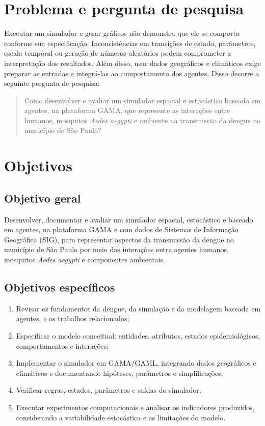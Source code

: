 \section{Problema e pergunta de pesquisa}

Executar um simulador e gerar gráficos não demonstra que ele se comporta conforme sua especificação. Inconsistências em transições de estado, parâmetros, escala temporal ou geração de números aleatórios podem comprometer a interpretação dos resultados. Além disso, usar dados geográficos e climáticos exige preparar as entradas e integrá-las ao comportamento dos agentes. Disso decorre a seguinte pergunta de pesquisa:

\begin{quote}
Como desenvolver e avaliar um simulador espacial e estocástico baseado em agentes, na plataforma GAMA, que represente as interações entre humanos, mosquitos \textit{Aedes aegypti} e ambiente na transmissão da dengue no município de São Paulo?
\end{quote}

\section{Objetivos}

\subsection{Objetivo geral}

Desenvolver, documentar e avaliar um simulador espacial, estocástico e baseado em agentes, na plataforma GAMA e com dados de Sistemas de Informação Geográfica (SIG), para representar aspectos da transmissão da dengue no município de São Paulo por meio das interações entre agentes humanos, mosquitos \textit{Aedes aegypti} e componentes ambientais.

\subsection{Objetivos específicos}

\begin{enumerate}
    \item Revisar os fundamentos da dengue, da simulação e da modelagem baseada em agentes, e os trabalhos relacionados;
    \item Especificar o modelo conceitual: entidades, atributos, estados epidemiológicos, comportamentos e interações;
    \item Implementar o simulador em GAMA/GAML, integrando dados geográficos e climáticos e documentando hipóteses, parâmetros e simplificações;
    \item Verificar regras, estados, parâmetros e saídas do simulador;
    \item Executar experimentos computacionais e analisar os indicadores produzidos, considerando a variabilidade estocástica e as limitações do modelo.
\end{enumerate}

